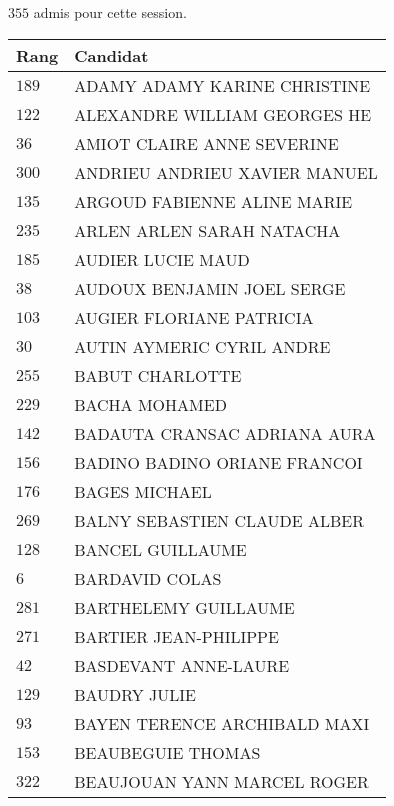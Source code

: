 



  $355$ admis pour cette session.

  \begin{xltabular}{\linewidth}{|l|X|}
    \hline
    \textbf{Rang} & \textbf{Candidat} \\
    \hline
    $189$ & ADAMY ADAMY KARINE CHRISTINE \\
    \hline
    $122$ & ALEXANDRE WILLIAM GEORGES HE \\
    \hline
    $36$ & AMIOT CLAIRE ANNE SEVERINE \\
    \hline
    $300$ & ANDRIEU ANDRIEU XAVIER MANUEL \\
    \hline
    $135$ & ARGOUD FABIENNE ALINE MARIE \\
    \hline
    $235$ & ARLEN ARLEN SARAH NATACHA \\
    \hline
    $185$ & AUDIER LUCIE MAUD \\
    \hline
    $38$ & AUDOUX BENJAMIN JOEL SERGE \\
    \hline
    $103$ & AUGIER FLORIANE PATRICIA \\
    \hline
    $30$ & AUTIN AYMERIC CYRIL ANDRE \\
    \hline
    $255$ & BABUT CHARLOTTE \\
    \hline
    $229$ & BACHA MOHAMED \\
    \hline
    $142$ & BADAUTA CRANSAC ADRIANA AURA \\
    \hline
    $156$ & BADINO BADINO ORIANE FRANCOI \\
    \hline
    $176$ & BAGES MICHAEL \\
    \hline
    $269$ & BALNY SEBASTIEN CLAUDE ALBER \\
    \hline
    $128$ & BANCEL GUILLAUME \\
    \hline
    $6$ & BARDAVID COLAS \\
    \hline
    $281$ & BARTHELEMY GUILLAUME \\
    \hline
    $271$ & BARTIER JEAN-PHILIPPE \\
    \hline
    $42$ & BASDEVANT ANNE-LAURE \\
    \hline
    $129$ & BAUDRY JULIE \\
    \hline
    $93$ & BAYEN TERENCE ARCHIBALD MAXI \\
    \hline
    $153$ & BEAUBEGUIE THOMAS \\
    \hline
    $322$ & BEAUJOUAN YANN MARCEL ROGER \\

\end{xltabular}
